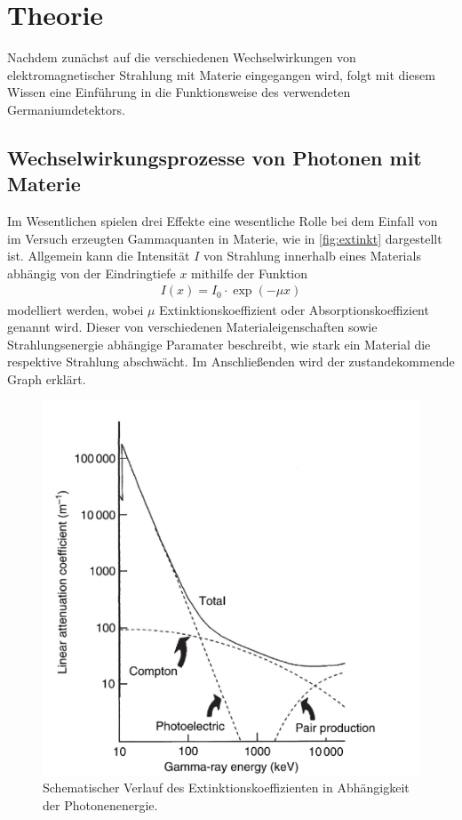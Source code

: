 \section{Theorie}\label{sec:theorie}
Nachdem zunächst auf die verschiedenen Wechselwirkungen von elektromagnetischer Strahlung mit Materie eingegangen wird, folgt mit diesem Wissen eine Einführung in die Funktionsweise des verwendeten Germaniumdetektors.
\subsection{Wechselwirkungsprozesse von Photonen mit Materie}
Im Wesentlichen spielen drei Effekte eine wesentliche Rolle bei dem Einfall von im Versuch erzeugten Gammaquanten in Materie, wie in \autoref{fig:extinkt} dargestellt ist.
Allgemein kann die Intensität $I$ von Strahlung innerhalb eines Materials abhängig von der Eindringtiefe $x$ mithilfe der Funktion
\begin{align}
  I(x) = I_0\cdot\exp{(-\mu x)}
\end{align}
modelliert werden, wobei $\mu$ Extinktionskoeffizient oder Absorptionskoeffizient genannt wird. Dieser von verschiedenen Materialeigenschaften sowie Strahlungsenergie abhängige Paramater beschreibt, wie stark ein Material die respektive Strahlung abschwächt.
Im Anschließenden wird der zustandekommende Graph erklärt.
\begin{figure}[H]
  \centering
  \includegraphics[scale=0.65]{Ressourcen/extinkt.png}
  \caption{Schematischer Verlauf des Extinktionskoeffizienten in Abhängigkeit der Photonenenergie\cite{gilmore}.}
  \label{fig:extinkt}
\end{figure}
